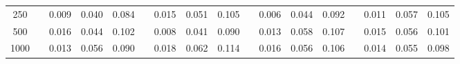 % 
\begin{tabular}{ccccccccccccccccc}
  \hline
  \hline
250 &  & 0.009 & 0.040 & 0.084 &  & 0.015 & 0.051 & 0.105 &  & 0.006 & 0.044 & 0.092 &  & 0.011 & 0.057 & 0.105 \\ 
  500 &  & 0.016 & 0.044 & 0.102 &  & 0.008 & 0.041 & 0.090 &  & 0.013 & 0.058 & 0.107 &  & 0.015 & 0.056 & 0.101 \\ 
  1000 &  & 0.013 & 0.056 & 0.090 &  & 0.018 & 0.062 & 0.114 &  & 0.016 & 0.056 & 0.106 &  & 0.014 & 0.055 & 0.098 \\ 
   \hline
\end{tabular}
